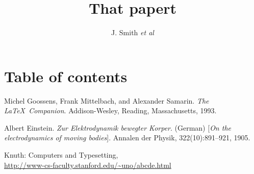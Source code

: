 \documentclass[a4paper]{article}
\begin{document}
\author{J. Smith
\emph{et al}
}
\title{That papert}

\maketitle









\section*{Table of contents}
\tableofcontents

\printindex




\begin{thebibliography}{9}
Michel Goossens, Frank Mittelbach, and Alexander Samarin. 
\textit{The \LaTeX\ Companion}. 
Addison-Wesley, Reading, Massachusetts, 1993.

Albert Einstein. 
\textit{Zur Elektrodynamik bewegter Korper}. (German) 
[\textit{On the electrodynamics of moving bodies}]. 
Annalen der Physik, 322(10):891–921, 1905.

Knuth: Computers and Typesetting,
\\ \url{http://www-cs-faculty.stanford.edu/~uno/abcde.html}
\end{thebibliography}
\end{document}
